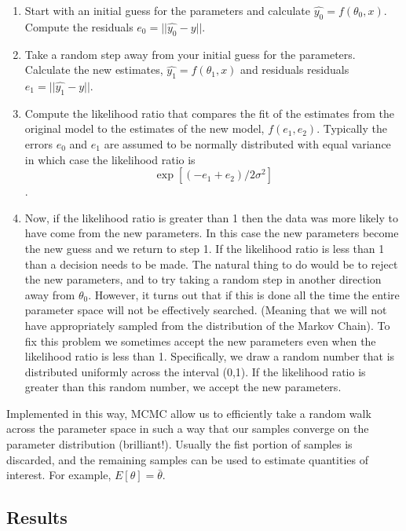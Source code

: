 \documentclass[10pt,a4paper]{article}
\begin{document}
\begin{enumerate}
 \item Start with an initial guess for the parameters and calculate $\hat{y_0}=f(\theta_0,x)$. Compute the residuals $e_0=||\hat{y_0}-y||$. 
 
 \item Take a random step away from your initial guess for the parameters. Calculate the new estimates, $\hat{y_1}=f(\theta_1,x)$ and residuals residuals $e_1=||\hat{y_1}-y||$.
 
 \item Compute the likelihood ratio that compares the fit of the estimates from the original model to the estimates of the new model, $f(e_1,e_2)$. Typically the errors $e_0$ and $e_1$ are assumed to be normally distributed with equal variance in which case the likelihood ratio is $$\exp[(-e_1+e_2)/2\sigma^2]$$. 
 
 \item Now, if the likelihood ratio is greater than 1 then the data was more likely to have come from the new parameters. In this case the new parameters become the new guess and we return to step 1.   If the likelihood ratio is less than 1 than a decision needs to be made. The natural thing to do would be to reject the new parameters, and to try taking a random step in another direction away from $\theta_0$. However, it turns out that if this is done all the time the entire parameter space will not be effectively searched. (Meaning that we will not have appropriately sampled from the distribution of the Markov Chain). To fix this problem we sometimes accept the new parameters even when the likelihood ratio is less than 1. Specifically, we draw a random number that is distributed uniformly across the interval (0,1). If the likelihood ratio is greater than this random number, we accept the new parameters.
 
\end{enumerate}

Implemented in this way, MCMC allow us to efficiently take a random walk across the parameter space in such a way that our samples converge on the parameter distribution (brilliant!). Usually the fist portion of samples is discarded, and the remaining samples can be used to estimate quantities of interest. For example, $E[\theta]=\bar{\theta}$.

\subsection*{Results}
\end{document}
